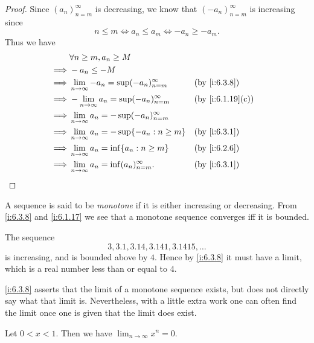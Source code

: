 \begin{proof}
  Since \((a_n)_{n = m}^\infty\) is decreasing, we know that \((-a_n)_{n = m}^\infty\) is increasing since
  \[
    n \leq m \iff a_n \leq a_m \iff -a_n \geq -a_m.
  \]
  Thus we have
  \begin{align*}
             & \forall n \geq m, a_n \geq M                                               \\
    \implies & -a_n \leq -M                                                               \\
    \implies & \lim_{n \to \infty} -a_n = \sup(-a_n)_{n = m}^\infty &  & \by{i:6.3.8}     \\
    \implies & -\lim_{n \to \infty} a_n = \sup(-a_n)_{n = m}^\infty &  & \by{i:6.1.19}[c] \\
    \implies & \lim_{n \to \infty} a_n = -\sup(-a_n)_{n = m}^\infty                       \\
    \implies & \lim_{n \to \infty} a_n = -\sup\set{-a_n : n \geq m} &  & \by{i:6.3.1}     \\
    \implies & \lim_{n \to \infty} a_n = \inf\set{a_n : n \geq m}   &  & \by{i:6.2.6}     \\
    \implies & \lim_{n \to \infty} a_n = \inf(a_n)_{n = m}^\infty.  &  & \by{i:6.3.1}
  \end{align*}
\end{proof}

\begin{note}
  A sequence is said to be \emph{monotone} if it is either increasing or decreasing.
  From \cref{i:6.3.8} and \cref{i:6.1.17} we see that a monotone sequence converges iff it is bounded.
\end{note}

\begin{eg}\label{i:6.3.9}
  The sequence
  \[
    3, 3.1, 3.14, 3.141, 3.1415, \dots
  \]
  is increasing, and is bounded above by \(4\).
  Hence by \cref{i:6.3.8} it must have a limit, which is a real number less than or equal to \(4\).
\end{eg}

\begin{note}
  \cref{i:6.3.8} asserts that the limit of a monotone sequence exists, but does not directly say what that limit is.
  Nevertheless, with a little extra work one can often find the limit once one is given that the limit does exist.
\end{note}

\begin{prop}\label{i:6.3.10}
  Let \(0 < x < 1\).
  Then we have \(\lim_{n \to \infty} x^n = 0\).
\end{prop}

